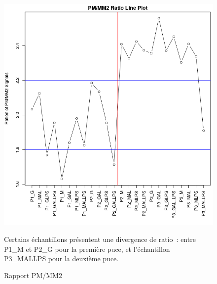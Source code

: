 \documentclass[a4paper,10pt]{article}
\begin{document}
\begin{figure}
 \centering
 \includegraphics[scale=0.5]{../../R/output/ratiopmmm2.png}
 \caption{Rapport PM/MM2}
 \label{fig:pmmm2ratio}
 Certains échantillons présentent une divergence de ratio : entre P1\_M et P2\_G pour la première puce, et l’échantillon P3\_MALLPS pour la deuxième puce.
\end{figure}
\end{document}
